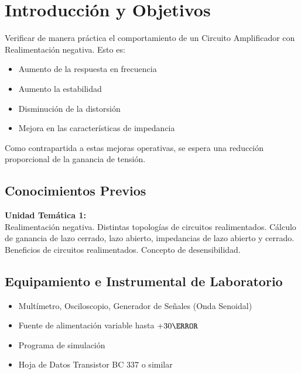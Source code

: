 \chapter{Introducción y Objetivos}
Verificar de manera práctica el comportamiento de un Circuito Amplificador con Realimentación negativa. Esto es:
\begin{itemize}
    \item Aumento de la respuesta en frecuencia
    \item Aumento la estabilidad
    \item Disminución de la distorsión 
    \item Mejora en las características de impedancia
\end{itemize}
Como contrapartida a estas mejoras operativas, se espera una reducción proporcional de la ganancia de tensión.


\section{Conocimientos Previos}
\textbf{Unidad Temática 1:}\\
Realimentación negativa. Distintas topologías de circuitos realimentados. Cálculo de ganancia de lazo cerrado, lazo 
abierto, impedancias de lazo abierto y cerrado. Beneficios de circuitos realimentados. Concepto de desensibilidad.

\section{Equipamiento e Instrumental de Laboratorio}
\begin{itemize}
    \item Multímetro, Osciloscopio, Generador de Señales (Onda Senoidal)
    \item Fuente de alimentación variable hasta $+30 \V$
    \item Programa de simulación
    \item Hoja de Datos Transistor BC 337 o similar
\end{itemize}
